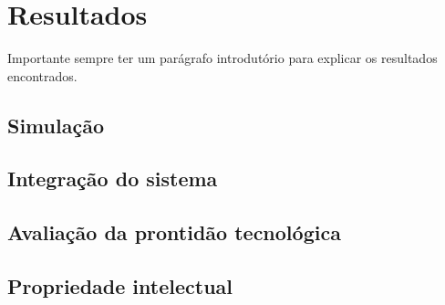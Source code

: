 \chapter{Resultados}
\label{chap:result}
Importante sempre ter um parágrafo introdutório para explicar os resultados encontrados.

\section{Simulação}
\label{sec:simul}
\lipsum[1]

\section{Integração do sistema}
\label{sec:intsis}
\lipsum[1]




\section{Avaliação da prontidão tecnológica}
\label{sec:trl}
\lipsum[1]




\section{Propriedade intelectual}
\label{sec:pi}
\lipsum[1]







